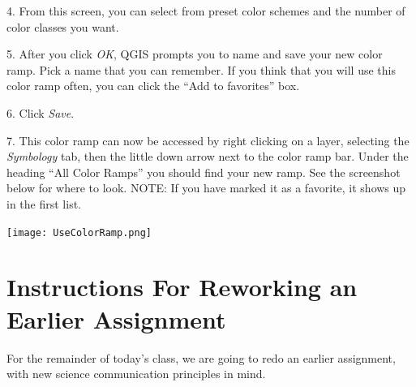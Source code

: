 \documentclass[oneside,a4paper,11pt,explicit]{book}
\begin{document}
\vspace{.5em}

4. From this screen, you can select from preset color schemes and the number of color classes you want.

5. After you click \textit{OK}, QGIS prompts you to name and save your new color ramp. Pick a name that you can remember. If you think that you will use this color ramp often, you can click the ``Add to favorites'' box. 

6. Click \textit{Save}.

7. This color ramp can now be accessed by right clicking on a layer, selecting the \textit{Symbology} tab, then the little down arrow next to the color ramp bar. Under the heading ``All Color Ramps'' you should find your new ramp. See the screenshot below for where to look. NOTE: If you have marked it as a favorite, it shows up in the first list. 

\centerline{\texttt{[image: UseColorRamp.png]}}

\vspace{.5em}

\section{Instructions For Reworking an Earlier Assignment}

For the remainder of today's class, we are going to redo an earlier assignment, with new science communication principles in mind.
\end{document}
